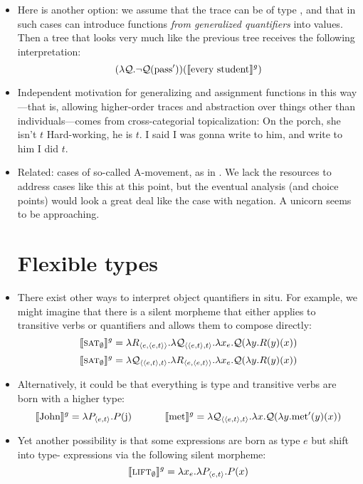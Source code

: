 \begin{itemize}
\item Here is another option: we assume that the trace can be of type , and that in such cases  can introduce functions \emph{from generalized quantifiers} into values. Then a tree that looks very much like the previous tree receives the following interpretation:%
\[(\lambda {\cal Q}.\neg{\cal Q}(\text{pass}'))(\llbracket \text{every student} \rrbracket^g)\]

\item Independent motivation for generalizing  and assignment functions in this way---that is, allowing higher-order traces and abstraction over things other than individuals---comes from cross-categorial topicalization:%
\bex
	\ex On the porch, she isn't $t$
	\ex Hard-working, he is $t$.
	\ex I said I was gonna write to him, and write to him I did $t$.
\eex

\item Related: cases of so-called A-movement, as in . We lack the resources to address cases like this at this point, but the eventual analysis (and choice points) would look a great deal like the case with negation. %
\bex
	\ex\label{amo}A unicorn seems to be approaching.
\eex 


\section{Flexible types}

\item There exist other ways to interpret object quantifiers in situ. For example, we might imagine that there is a silent morpheme that either applies to transitive verbs or quantifiers and allows them to compose directly:%
\[\llbracket \textsc{sat}_\emptyset \rrbracket^g = \lambda R_{\langle e,\langle e,t \rangle \rangle}.\lambda {\cal Q}_{\langle \langle e,t \rangle,t \rangle}.\lambda x_e.{\cal Q}(\lambda y.R(y)(x))\]%
\[\llbracket \textsc{sat}_\emptyset \rrbracket^g = \lambda {\cal Q}_{\langle \langle e,t \rangle,t \rangle}.\lambda R_{\langle e,\langle e,t \rangle \rangle}.\lambda x_e.{\cal Q}(\lambda y.R(y)(x))\]%

\item Alternatively, it could be that everything is type  and transitive verbs are born with a higher type:%
\[\llbracket \text{John} \rrbracket^g = \lambda P_{\langle e,t \rangle}.P(\text{j})~~~~~~~~~~\llbracket \text{met} \rrbracket^g = \lambda {\cal Q}_{\langle \langle e,t \rangle,t \rangle}.\lambda x.{\cal Q}(\lambda y.\text{met}'(y)(x))\]%


\item Yet another possibility is that some expressions are born as type $e$ but shift into type- expressions via the following silent morpheme: %
\[\llbracket \textsc{lift}_\emptyset \rrbracket^g = \lambda x_e.\lambda P_{\langle e,t \rangle}.P(x)\]


\end{itemize}
